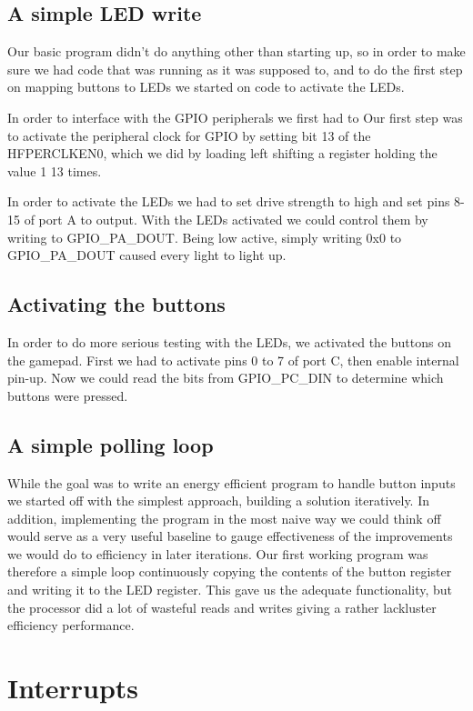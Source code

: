 \subsection{A simple LED write}

Our basic program didn’t do anything other than starting up, so in order to make sure we had code that was running as it was supposed to, and to do the first step on mapping buttons to LEDs we started on code to activate the LEDs. 

In order to interface with the GPIO peripherals we first had to 
Our first step was to activate the peripheral clock for GPIO by setting bit 13 of the HFPERCLKEN0, which we did by loading left shifting a register holding the value 1 13 times.

In order to activate the LEDs we had to set drive strength to high and set pins 8-15 of port A to output. With the LEDs activated we could control them by writing to GPIO\_PA\_DOUT. Being low active, simply writing 0x0 to GPIO\_PA\_DOUT caused every light to light up. 

\subsection{Activating the buttons}

In order to do more serious testing with the LEDs, we activated the buttons on the gamepad.
First we had to activate pins 0 to 7 of port C, then enable internal pin-up. Now we could read the bits from GPIO\_PC\_DIN to determine which buttons were pressed.

\subsection{A simple polling loop}

While the goal was to write an energy efficient program to handle button inputs we started off with the simplest approach, building a solution iteratively. In addition, implementing the program in the most naive way we could think off would serve as a very useful baseline to gauge effectiveness of the improvements we would do to efficiency in later iterations.
Our first working program was therefore a simple loop continuously copying the contents of the button register and writing it to the LED register. This gave us the adequate functionality, but the processor did a lot of wasteful reads and writes giving a rather lackluster efficiency performance. 

\section{Interrupts}

